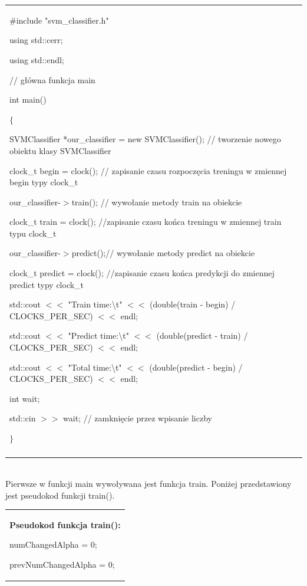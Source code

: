 \documentclass[[10pt,a4paper]{article}
\begin{document}
\begin{enumerate}
\begin{tabular}{|p{11.5cm}|}
\noindent \#include "svm\_classifier.h"

\noindent 

\noindent using std::cerr;

\noindent using std::endl;

\noindent // g{\l}\'{o}wna funkcja main

\noindent int main()

\noindent $\{$

 SVMClassifier *our\_classifier = new SVMClassifier();  // tworzenie nowego obiektu klasy SVMClassifier 

\noindent 

 clock\_t begin = clock();  // zapisanie czasu rozpocz\k{e}cia treningu w zmiennej begin typy clock\_t

 our\_classifier-$>$train(); // wywo{\l}anie metody train na obiekcie

 clock\_t train = clock(); //zapisanie czasu ko\'{n}ca treningu w zmiennej train typu clock\_t

 our\_classifier-$>$predict();// wywo{\l}anie metody predict na obiekcie

 clock\_t predict = clock(); //zapisanie czasu ko\'{n}ca predykcji do zmiennej predict typy clock\_t

 std::cout $<$$<$ "Train time:{\textbackslash}t" $<$$<$ (double(train - begin) / CLOCKS\_PER\_SEC) $<$$<$ endl;

 std::cout $<$$<$ "Predict time:{\textbackslash}t" $<$$<$ (double(predict - train) / CLOCKS\_PER\_SEC) $<$$<$ endl;

 std::cout $<$$<$ "Total time:{\textbackslash}t" $<$$<$ (double(predict - begin) / CLOCKS\_PER\_SEC) $<$$<$ endl;

 int wait;

 std::cin $>$$>$ wait; // zamkni\k{e}cie przez wpisanie liczby

\noindent 

\noindent $\}$
\\\\ \hline
\end{tabular}
\\
Pierwsze w funkcji main wywoływana jest funkcja train. Poniżej przedstawiony jest pseudokod funkcji train().\\
\begin{tabular}{|p{11.5cm}|} \hline
\noindent \textbf{Pseudokod funkcja train():}

 numChangedAlpha = 0;

 prevNumChangedAlpha = 0;


\end{tabular}
\end{enumerate}
\end{document}

